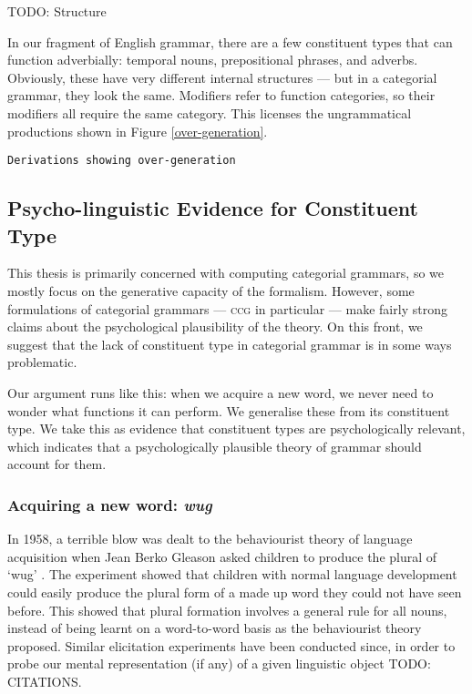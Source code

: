 \documentclass[11pt,twoside,final]{ahudson-harvard}
\newcommand{\ccg}{\textsc{ccg}\xspace}
\begin{document}
TODO: Structure

In our fragment of English grammar, there are a few constituent types that can function adverbially: temporal nouns, prepositional phrases, and adverbs. Obviously, these have very different internal structures --- but in a categorial grammar, they look the same. Modifiers refer to function categories, so their modifiers all require the same category. This licenses the ungrammatical productions shown in Figure \ref{over-generation}.

\begin{verbatim}
Derivations showing over-generation
\end{verbatim}


\subsection{Psycho-linguistic Evidence for Constituent Type}

This thesis is primarily concerned with computing categorial grammars, so we mostly focus on the generative capacity of the formalism. However, some formulations of categorial grammars --- \ccg in particular --- make fairly strong claims about the psychological plausibility of the theory. On this front, we suggest that the lack of constituent type in categorial grammar is in some ways problematic.

Our argument runs like this: when we acquire a new word, we never need to wonder what functions it can perform. We generalise these from its constituent type. We take this as evidence that constituent types are psychologically relevant, which indicates that a psychologically plausible theory of grammar should account for them.

\subsubsection{Acquiring a new word: \emph{wug}}

In 1958, a terrible blow was dealt to the behaviourist theory of language acquisition when Jean Berko Gleason asked children to produce the plural of `wug' \citep{berko}. The experiment showed that children with normal language development could easily produce the plural form of a made up word they could not have seen before. This showed that plural formation involves a general rule for all nouns, instead of being learnt on a word-to-word basis as the behaviourist theory proposed. Similar elicitation experiments have been conducted since, in order to probe our mental representation (if any) of a given linguistic object TODO: CITATIONS.
\end{document}
